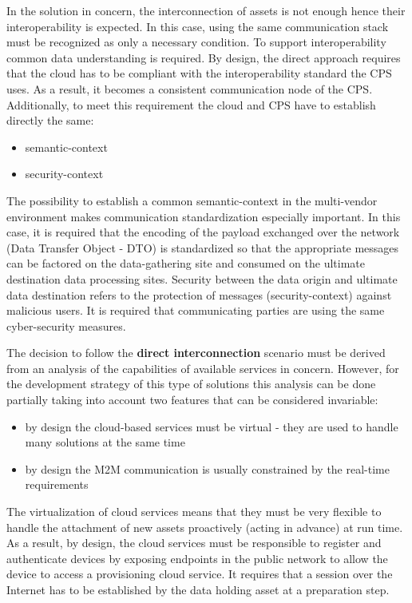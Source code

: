 \documentclass[runningheads]{llncs}
\begin{document}
In the solution in concern, the interconnection of assets is not enough  hence their interoperability is expected. In this case, using the same communication stack must be recognized as only a necessary condition. To support interoperability common data understanding is required. By design, the direct approach requires that the cloud has to be compliant with the interoperability standard the CPS uses. As a result, it becomes a consistent communication node of the CPS. Additionally, to meet this requirement the cloud and CPS have to establish directly the same:

\begin{itemize}
      \item semantic-context
      \item security-context
\end{itemize}

The possibility to establish a common semantic-context in the multi-vendor environment makes communication standardization especially important. In this case, it is required that the encoding of the payload exchanged over the network (Data Transfer Object - DTO) is standardized so that the appropriate messages can be factored on the data-gathering site and consumed on the ultimate destination data processing sites. Security between the data origin and ultimate data destination refers to the protection of messages (security-context) against malicious users. It is required that communicating parties are using the same cyber-security measures.

The decision to follow the \textbf{direct interconnection} scenario must be derived from an analysis of the capabilities of available services in concern. However, for the development strategy of this type of solutions this analysis can be done partially taking into account two features that can be considered invariable:

\begin{itemize}
      \item by design the cloud-based services must be virtual - they are used to handle many solutions at the same time
      \item by design the M2M communication is usually constrained by the real-time requirements
\end{itemize}

The virtualization of cloud services means that they must be very flexible to handle the attachment of new assets proactively (acting in advance) at run time. As a result, by design, the cloud services must be responsible to register and authenticate devices by exposing endpoints in the public network to allow the device to access a provisioning cloud service. It requires that a session over the Internet has to be established by the data holding asset at a preparation step.
\end{document}
